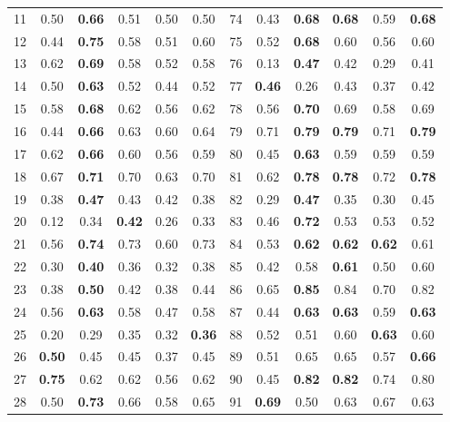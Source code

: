 \documentclass{article}
\begin{document}
{\begin{longtable}{cccccc@{\qquad}cccccc}
11 & 0.50 & \textbf{0.66} & 0.51 & 0.50 & 0.50 & 74 & 0.43 & \textbf{0.68} & \textbf{0.68} & 0.59 & \textbf{0.68} \\
12 & 0.44 & \textbf{0.75} & 0.58 & 0.51 & 0.60 & 75 & 0.52 & \textbf{0.68} & 0.60 & 0.56 & 0.60 \\
13 & 0.62 & \textbf{0.69} & 0.58 & 0.52 & 0.58 & 76 & 0.13 & \textbf{0.47} & 0.42 & 0.29 & 0.41 \\
14 & 0.50 & \textbf{0.63} & 0.52 & 0.44 & 0.52 & 77 & \textbf{0.46} & 0.26 & 0.43 & 0.37 & 0.42 \\
15 & 0.58 & \textbf{0.68} & 0.62 & 0.56 & 0.62 & 78 & 0.56 & \textbf{0.70} & 0.69 & 0.58 & 0.69 \\
16 & 0.44 & \textbf{0.66} & 0.63 & 0.60 & 0.64 & 79 & 0.71 & \textbf{0.79} & \textbf{0.79} & 0.71 & \textbf{0.79} \\
17 & 0.62 & \textbf{0.66} & 0.60 & 0.56 & 0.59 & 80 & 0.45 & \textbf{0.63} & 0.59 & 0.59 & 0.59 \\
18 & 0.67 & \textbf{0.71} & 0.70 & 0.63 & 0.70 & 81 & 0.62 & \textbf{0.78} & \textbf{0.78} & 0.72 & \textbf{0.78} \\
19 & 0.38 & \textbf{0.47} & 0.43 & 0.42 & 0.38 & 82 & 0.29 & \textbf{0.47} & 0.35 & 0.30 & 0.45 \\
20 & 0.12 & 0.34 & \textbf{0.42} & 0.26 & 0.33 & 83 & 0.46 & \textbf{0.72} & 0.53 & 0.53 & 0.52 \\
21 & 0.56 & \textbf{0.74} & 0.73 & 0.60 & 0.73 & 84 & 0.53 & \textbf{0.62} & \textbf{0.62} & \textbf{0.62} & 0.61 \\
22 & 0.30 & \textbf{0.40} & 0.36 & 0.32 & 0.38 & 85 & 0.42 & 0.58 & \textbf{0.61} & 0.50 & 0.60 \\
23 & 0.38 & \textbf{0.50} & 0.42 & 0.38 & 0.44 & 86 & 0.65 & \textbf{0.85} & 0.84 & 0.70 & 0.82 \\
24 & 0.56 & \textbf{0.63} & 0.58 & 0.47 & 0.58 & 87 & 0.44 & \textbf{0.63} & \textbf{0.63} & 0.59 & \textbf{0.63} \\
25 & 0.20 & 0.29 & 0.35 & 0.32 & \textbf{0.36} & 88 & 0.52 & 0.51 & 0.60 & \textbf{0.63} & 0.60 \\
26 & \textbf{0.50} & 0.45 & 0.45 & 0.37 & 0.45 & 89 & 0.51 & 0.65 & 0.65 & 0.57 & \textbf{0.66} \\
27 & \textbf{0.75} & 0.62 & 0.62 & 0.56 & 0.62 & 90 & 0.45 & \textbf{0.82} & \textbf{0.82} & 0.74 & 0.80 \\
28 & 0.50 & \textbf{0.73} & 0.66 & 0.58 & 0.65 & 91 & \textbf{0.69} & 0.50 & 0.63 & 0.67 & 0.63 \\

\end{longtable}}
\end{document}

